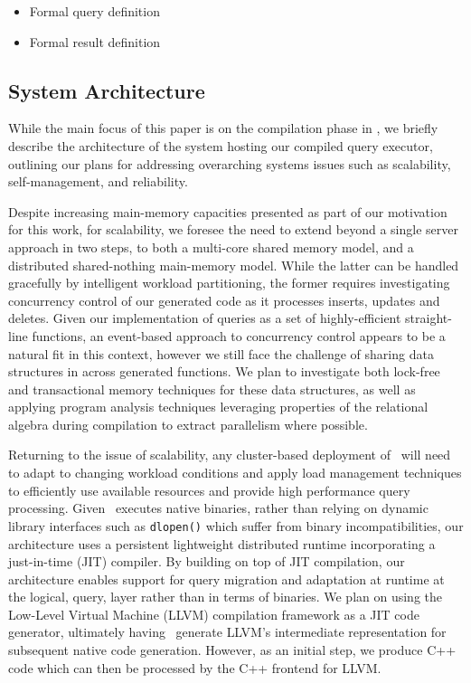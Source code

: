 \begin{itemize}
  \item Formal query definition
  \item Formal result definition
\end{itemize}
 
\subsection{System Architecture}
While the main focus of this paper is on the compilation phase in \compiler, we
briefly describe the architecture of the system hosting our compiled
query executor, outlining our plans for addressing overarching systems issues
such as scalability, self-management, and reliability.

Despite increasing main-memory capacities presented as part of our motivation for
this work, for scalability, we foresee the need to extend beyond a single server
approach in two steps, to both a multi-core shared memory model, and a
distributed shared-nothing main-memory model. While the latter can be handled
gracefully by intelligent workload partitioning, the former requires
investigating concurrency control of our generated code as it processes inserts,
updates and deletes. Given our implementation of queries as a set of
highly-efficient straight-line functions, an event-based approach to concurrency
control appears to be a natural fit in this context, however we still face the
challenge of sharing data structures in across generated functions. We plan to
investigate both lock-free and transactional memory techniques for these data
structures, as well as applying program analysis techniques leveraging properties
of the relational algebra during compilation to extract parallelism where
possible.

Returning to the issue of scalability, any cluster-based deployment of \compiler\
will need to adapt to changing workload conditions and apply load management
techniques to efficiently use available resources and provide high performance
query processing. Given \compiler\ executes native binaries, rather than relying
on dynamic library interfaces such as \texttt{dlopen()} which suffer from binary
incompatibilities, our architecture uses a persistent lightweight distributed
runtime incorporating a just-in-time (JIT) compiler. By building on top of JIT
compilation, our architecture enables support for query migration and adaptation
at runtime at the logical, query, layer rather than in terms of binaries. We plan
on using the Low-Level Virtual Machine (LLVM) compilation framework as a JIT code
generator, ultimately having \compiler\ generate LLVM's intermediate
representation for subsequent native code generation. However, as an initial
step, we produce C++ code which can then be processed by the C++ frontend for
LLVM.

